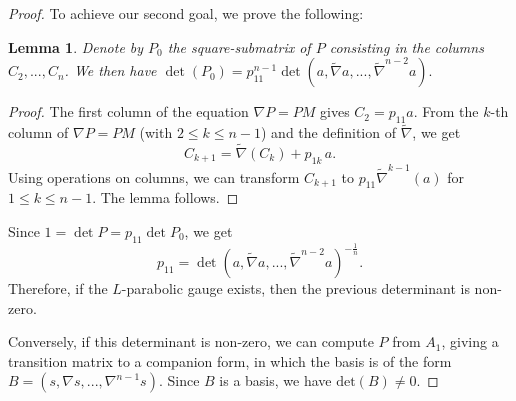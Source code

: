 \documentclass[10pt,a4paper]{amsart}
\newtheorem{lemma}{Lemma}
\begin{document}
\begin{proof}
To achieve our second goal, we prove the following:
\begin{lemma}
Denote by $P_0$ the square-submatrix of $P$ consisting in the columns $C_2, ..., C_n$. We then have $\det(P_0) = p_{11}^{n-1}\det(a,\widetilde{\nabla}a,...,\widetilde{\nabla}^{n-2}a).$
\end{lemma}
\begin{proof}
The first column of the equation $\nabla P=PM$ gives $C_2=p_{11}a$. From the $k$-th column of $\nabla P=PM$ (with $2\leq k\leq n-1$) and the definition of $\widetilde{\nabla}$, we get $$C_{k+1}=\widetilde{\nabla}(C_k)+p_{1k}\, a.$$
Using operations on columns, we can transform $C_{k+1}$ to $p_{11}\widetilde{\nabla}^{k-1}(a)$ for $1\leq k\leq n-1$. The lemma follows.
\end{proof}

Since $1=\det P =p_{11}\det P_0$, we get $$p_{11} = \det(a,\widetilde{\nabla}a,...,\widetilde{\nabla}^{n-2}a)^{-\frac{1}{n}}.$$
Therefore, if the $L$-parabolic gauge exists, then the previous determinant is non-zero.

Conversely, if this determinant is non-zero, we can compute $P$ from $A_1$, giving a transition matrix to a companion form, in which the basis is of the form $B=(s,\nabla s, ..., \nabla^{n-1}s)$. Since $B$ is a basis, we have $\mathrm{det}(B)\neq 0$.
\end{proof}
\end{document}
